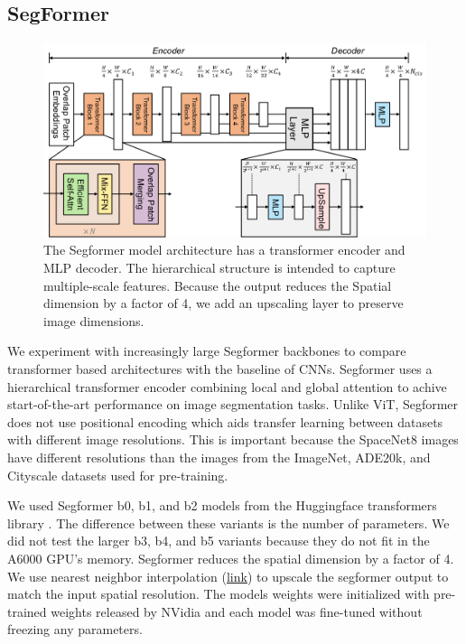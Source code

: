\documentclass[10pt,twocolumn,letterpaper]{article}
\begin{document}
\subsection{SegFormer}
\begin{figure}[t]
  \centering
   \includegraphics[width=1.0\linewidth]{figures/segformer_architecture.png}
   \caption{The Segformer model architecture has a transformer encoder and MLP decoder. The hierarchical structure is intended to capture multiple-scale features. Because the output reduces the Spatial dimension by a factor of 4, we add an upscaling layer to preserve image dimensions.}
   \label{fig:segformer}
\end{figure}

We experiment with increasingly large Segformer backbones to compare transformer based architectures with the baseline of CNNs. Segformer uses a hierarchical transformer encoder combining local and global attention to achive start-of-the-art performance on image segmentation tasks. Unlike ViT, Segformer does not use positional encoding which aids transfer learning between datasets with different image resolutions. This is important because the SpaceNet8 images have different resolutions than the images from the ImageNet, ADE20k, and Cityscale datasets used for pre-training.

We used Segformer b0, b1, and b2 models from the Huggingface transformers library \cite{wolf-etal-2020-transformers}. The difference between these variants is the number of parameters. We did not test the larger b3, b4, and b5 variants because they do not fit in the A6000 GPU's memory. Segformer reduces the spatial dimension by a factor of 4. We use nearest neighbor interpolation (\href{https://pytorch.org/docs/stable/generated/torch.nn.functional.interpolate.html}{link}) to upscale the segformer output to match the input spatial resolution. The models weights were initialized with pre-trained weights released by NVidia and each model was fine-tuned without freezing any parameters.
\end{document}
